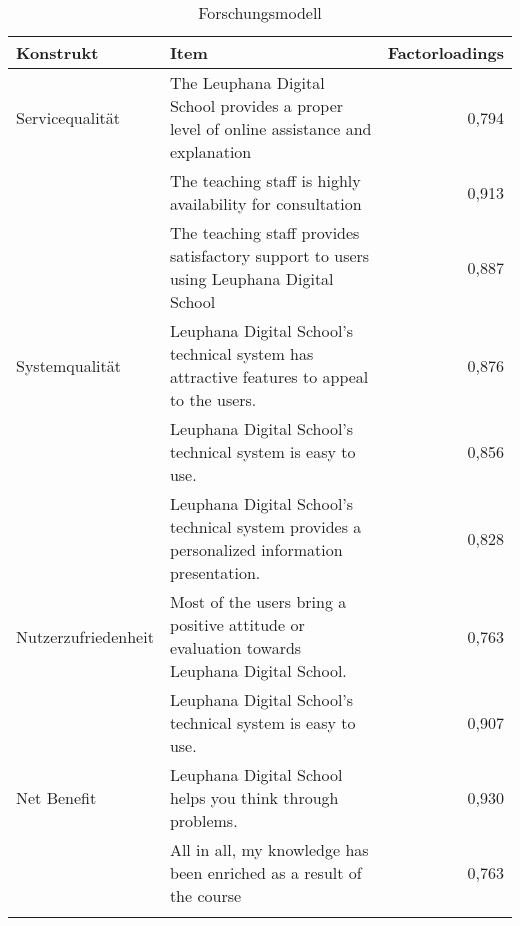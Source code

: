 \begin{table}[ht] 
\footnotesize
\caption{Forschungsmodell}
\label{tab:Forschungsmodell} 
\begin{tabular}{@{}lp{10cm}r@{}} \toprule

\textbf{Konstrukt} & \textbf{Item} & \textbf{Factorloadings} \\ \midrule

Servicequalität & The Leuphana Digital School provides a proper level of online assistance and explanation & 0,794\\ 

& The teaching staff is highly availability for consultation & 0,913 \\

& The teaching staff provides satisfactory support to users using Leuphana Digital School & 0,887 \\ 

Systemqualität & Leuphana Digital School’s technical system has attractive features to appeal to the users. & 0,876\\ 

& Leuphana Digital School’s technical system is easy to use. & 0,856 \\

& Leuphana Digital School’s technical system provides a personalized information presentation. & 0,828 \\ 

Nutzerzufriedenheit & Most of the users bring a positive attitude or evaluation towards Leuphana Digital School. & 0,763\\ 

& Leuphana Digital School’s technical system is easy to use. & 0,907 \\ 

Net Benefit & Leuphana Digital School helps you think through problems.  & 0,930\\ 

& All in all, my knowledge has been enriched as a result of the course & 0,763 \\ \addlinespace 
  \bottomrule

\end{tabular}	
\end{table}


